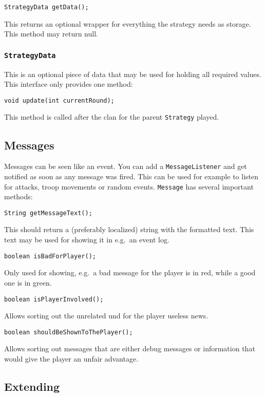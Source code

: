 \documentclass{article}
\begin{document}
    \begin{verbatim}
StrategyData getData();
    \end{verbatim}
    This returns an optional wrapper for everything the strategy needs as storage. This method may return null.

    \subsubsection{\texttt{StrategyData}}
    This is an optional piece of data that may be used for holding all required values. This interface only provides one method:
    \begin{verbatim}
void update(int currentRound);
    \end{verbatim}
    This method is called after the clan for the parent \texttt{Strategy} played.

    \subsection{Messages}
    Messages can be seen like an event. You can add a \texttt{MessageListener} and get notified as soon as any message was fired. This can be used for example to listen for attacks, troop movements or random events.
    \texttt{Message} has several important methods:
    \begin{verbatim}
String getMessageText();
    \end{verbatim}
    This should return a (preferably localized) string with the formatted text. This text may be used for showing it in e.g.\ an event log.
    \begin{verbatim}
boolean isBadForPlayer();
    \end{verbatim}
    Only used for showing, e.g.\ a bad message for the player is in red, while a good one is in green.
    \begin{verbatim}
boolean isPlayerInvolved();
    \end{verbatim}
    Allows sorting out the unrelated und for the player useless news.
    \begin{verbatim}
boolean shouldBeShownToThePlayer();
    \end{verbatim}
    Allows sorting out messages that are either debug messages or information that would give the player an unfair advantage.
    \newpage

    \subsection{Extending}
\end{document}
